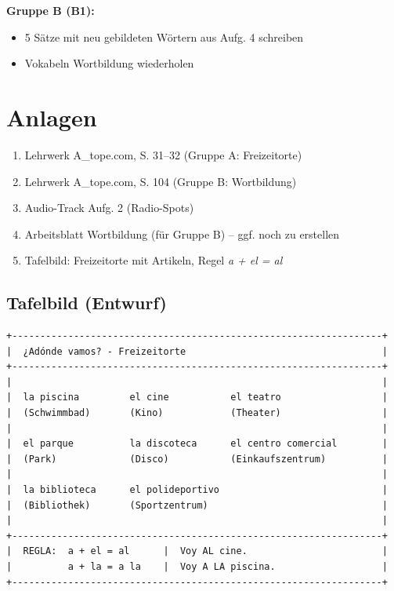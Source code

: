 \documentclass[11pt,a4paper]{article}
\begin{document}
\textbf{Gruppe B (B1):}
\begin{itemize}
    \item 5 Sätze mit neu gebildeten Wörtern aus Aufg. 4 schreiben
    \item Vokabeln Wortbildung wiederholen
\end{itemize}

\section{Anlagen}

\begin{enumerate}
    \item Lehrwerk A\_tope.com, S. 31--32 (Gruppe A: Freizeitorte)
    \item Lehrwerk A\_tope.com, S. 104 (Gruppe B: Wortbildung)
    \item Audio-Track Aufg. 2 (Radio-Spots)
    \item Arbeitsblatt Wortbildung (für Gruppe B) -- ggf. noch zu erstellen
    \item Tafelbild: Freizeitorte mit Artikeln, Regel \textit{a + el = al}
\end{enumerate}

\subsection{Tafelbild (Entwurf)}

\begin{verbatim}
+------------------------------------------------------------------+
|  ¿Adónde vamos? - Freizeitorte                                   |
+------------------------------------------------------------------+
|                                                                  |
|  la piscina         el cine           el teatro                  |
|  (Schwimmbad)       (Kino)            (Theater)                  |
|                                                                  |
|  el parque          la discoteca      el centro comercial        |
|  (Park)             (Disco)           (Einkaufszentrum)          |
|                                                                  |
|  la biblioteca      el polideportivo                             |
|  (Bibliothek)       (Sportzentrum)                               |
|                                                                  |
+------------------------------------------------------------------+
|  REGLA:  a + el = al      |  Voy AL cine.                        |
|          a + la = a la    |  Voy A LA piscina.                   |
+------------------------------------------------------------------+
\end{verbatim}
\end{document}
